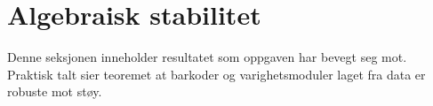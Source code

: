 \section{Algebraisk stabilitet}

Denne seksjonen inneholder resultatet som oppgaven har bevegt seg
mot. Praktisk talt sier teoremet at barkoder og varighetsmoduler
laget fra data er robuste mot støy.
